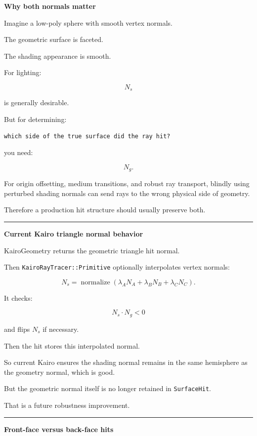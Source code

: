 \textbf{Why both normals matter}

Imagine a low-poly sphere with smooth vertex normals.

The geometric surface is faceted.

The shading appearance is smooth.

For lighting:

\[
N_s
\]

is generally desirable.

But for determining:

\begin{verbatim}
which side of the true surface did the ray hit?
\end{verbatim}

you need:

\[
N_g.
\]

For origin offsetting, medium transitions, and robust ray transport, blindly using perturbed shading normals can send rays to the wrong physical side of geometry.

Therefore a production hit structure should usually preserve both.

\begin{center}\rule{0.5\linewidth}{0.5pt}\end{center}

\textbf{Current Kairo triangle normal behavior}

KairoGeometry returns the geometric triangle hit normal.

Then \texttt{KairoRayTracer::Primitive} optionally interpolates vertex normals:

\[
N_s=
\operatorname{normalize}
(
\lambda_A N_A+
\lambda_B N_B+
\lambda_C N_C
).
\]

It checks:

\[
N_s\cdot N_g<0
\]

and flips \(N_s\) if necessary.

Then the hit stores this interpolated normal.

So current Kairo ensures the shading normal remains in the same hemisphere as the geometry normal, which is good.

But the geometric normal itself is no longer retained in \texttt{SurfaceHit}.

That is a future robustness improvement.

\begin{center}\rule{0.5\linewidth}{0.5pt}\end{center}

\textbf{Front-face versus back-face hits}

